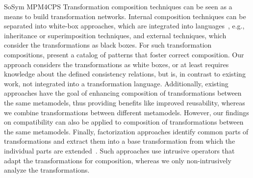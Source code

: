 \begin{copiedFrom}{SoSym MPM4CPS}
Transformation composition techniques can be seen as a means to build transformation networks.
Internal composition techniques can be separated into white-box approaches, which are integrated into languages~\cite{wagelaar2008a, wagelaar2010a, wagelaar2011a}, e.g., inheritance or superimposition techniques, and external techniques, which consider the transformations as black boxes.
For such transformation compositions, \textcite{lano2014a} present a catalog of patterns that foster correct composition.
Our approach considers the transformations as white boxes, or at least requires knowledge about the defined consistency relations, but is, in contrast to existing work, not integrated into a transformation language.
Additionally, existing approaches have the goal of enhancing composition of transformations between the same metamodels, thus providing benefits like improved reusability, whereas we combine transformations between different metamodels.
However, our findings on compatibility can also be applied to composition of transformations between the same metamodels.
Finally, factorization approaches identify common parts of transformations and extract them into a base transformation from which the individual parts are extended~\cite{cuadrado2008a}. Such approaches use intrusive operators that adapt the transformations for composition, whereas we only non-intrusively analyze the transformations.





\end{copiedFrom}
